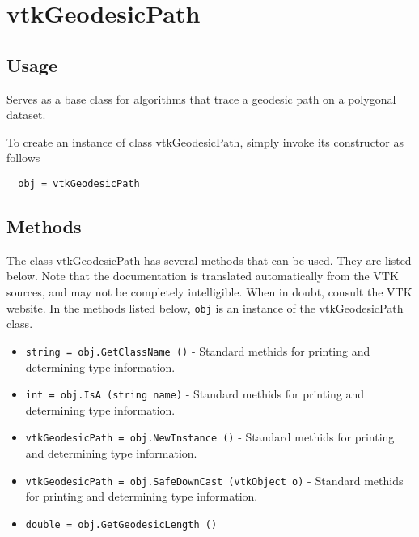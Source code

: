 \section{vtkGeodesicPath}

\subsection{Usage}

 Serves as a base class for algorithms that trace a geodesic path on a 
 polygonal dataset.

To create an instance of class vtkGeodesicPath, simply
invoke its constructor as follows
\begin{verbatim}
  obj = vtkGeodesicPath
\end{verbatim}
\subsection{Methods}

The class vtkGeodesicPath has several methods that can be used.
  They are listed below.
Note that the documentation is translated automatically from the VTK sources,
and may not be completely intelligible.  When in doubt, consult the VTK website.
In the methods listed below, \verb|obj| is an instance of the vtkGeodesicPath class.
\begin{itemize}
\item  \verb|string = obj.GetClassName ()| -  Standard methids for printing and determining type information.

\item  \verb|int = obj.IsA (string name)| -  Standard methids for printing and determining type information.

\item  \verb|vtkGeodesicPath = obj.NewInstance ()| -  Standard methids for printing and determining type information.

\item  \verb|vtkGeodesicPath = obj.SafeDownCast (vtkObject o)| -  Standard methids for printing and determining type information.

\item  \verb|double = obj.GetGeodesicLength ()|

\end{itemize}
